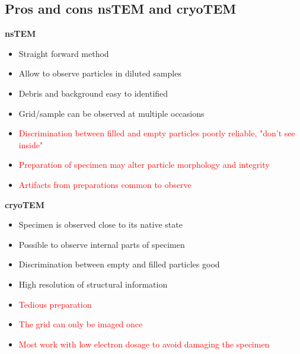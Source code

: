 	\subsection*{Pros and cons nsTEM and cryoTEM}
	\textbf{nsTEM}
	\begin{itemize}
		\item \textcolor{OliveGreen}{Straight forward method}
		\item \textcolor{OliveGreen}{Allow to observe particles in diluted samples} 
		\item \textcolor{OliveGreen}{Debris and background easy to identified}
		\item \textcolor{OliveGreen}{Grid/sample can be observed at multiple occasions}
		\item \textcolor{red}{Discrimination between filled and empty particles poorly reliable, "don't see inside"}
		\item \textcolor{red}{Preparation of specimen may alter particle morphology and integrity}
		\item \textcolor{red}{Artifacts from preparations common to observe}  
	\end{itemize}

	\textbf{cryoTEM}
	\begin{itemize}
		\item \textcolor{OliveGreen}{Specimen is observed close to its native state}
		\item \textcolor{OliveGreen}{Possible to observe internal parts of specimen}
		\item \textcolor{OliveGreen}{Discrimination between empty and filled particles good}
		\item \textcolor{OliveGreen}{High resolution of structural information}
		\item \textcolor{red}{Tedious preparation}
		\item \textcolor{red}{The grid can only be imaged once}
		\item \textcolor{red}{Most work with low electron dosage to avoid damaging the specimen}       
	\end{itemize}
	  
	
























	    


	      

